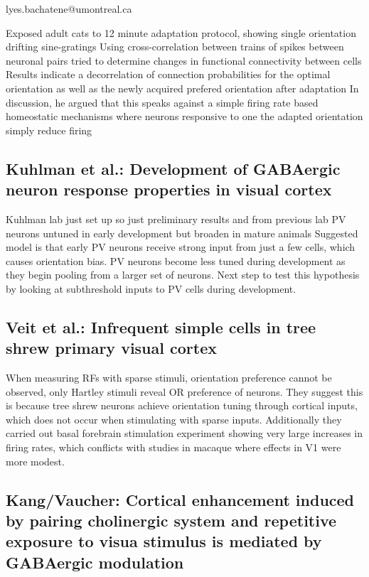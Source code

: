 \documentclass[11pt]{Science}
\begin{document}
lyes.bachatene@umontreal.ca

Exposed adult cats to 12 minute adaptation protocol, showing single orientation drifting sine-gratings
Using cross-correlation between trains of spikes between neuronal pairs tried to determine changes in functional connectivity between cells
Results indicate a decorrelation of connection probabilities for the optimal orientation as well as the newly acquired prefered orientation after adaptation
In discussion, he argued that this speaks against a simple firing rate based homeostatic mechanisms where neurons responsive to one the adapted orientation simply reduce firing

\subsection{Kuhlman et al.: Development of GABAergic neuron response properties in visual cortex}
\label{sec-1.9}


Kuhlman lab just set up so just preliminary results and from previous lab
PV neurons untuned in early development but broaden in mature animals
Suggested model is that early PV neurons receive strong input from just a few cells, which causes orientation bias.
PV neurons become less tuned during development as they begin pooling from a larger set of neurons.
Next step to test this hypothesis by looking at subthreshold inputs to PV cells during development.

\subsection{Veit et al.: Infrequent simple cells in tree shrew primary visual cortex}
\label{sec-1.10}


When measuring RFs with sparse stimuli, orientation preference cannot be observed, only Hartley stimuli reveal OR preference of neurons.
They suggest this is because tree shrew neurons achieve orientation tuning through cortical inputs, which does not occur when stimulating with sparse inputs.
Additionally they carried out basal forebrain stimulation experiment showing very large increases in firing rates, which conflicts with studies in macaque where effects in V1 were more modest.

\subsection{Kang/Vaucher: Cortical enhancement induced by pairing cholinergic system and repetitive exposure to visua stimulus is mediated by GABAergic modulation}
\label{sec-1.11}
\end{document}

